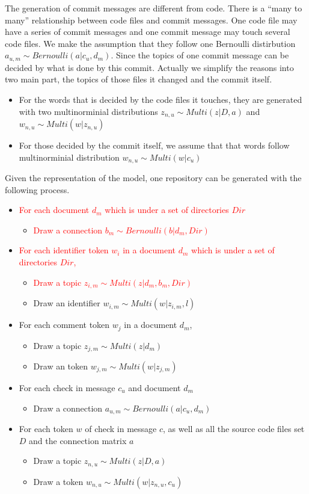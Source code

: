 The generation of commit messages are different from code. 
There is a ``many to many'' relationship between code files and commit messages.
One code file may have a series of commit messages and one commit message may touch
several code files. We make the assumption that they follow one Bernoulli distirbution
$a_{u,m}\sim Bernoulli(a|c_u,d_m)$. Since the topics of one commit message 
can be decided by what is done by this commit. Actually we simplify the reasons 
into two main part, the topics of those files it changed and the commit itself.
\begin{itemize}
\item For the words that is decided by the code files it touches, they are 
generated with two multinorminial distributions $z_{n,u}\sim Multi(z|D,a)$ and 
$w_{n,u} \sim Multi(w|z_{n,u})$ 
\item For those decided by the commit itself, we assume that that words 
follow multinorminial distribution $w_{n,u} \sim Multi(w|c_u)$ 
\end{itemize}

Given the representation of the model, one repository can be generated with the 
following process.

\begin{itemize}
\item \textcolor{red}{For each document $d_m$ which is under a set of directories $Dir$}
\begin{itemize}
\item \textcolor{red}{Draw a connection $b_{m}\sim Bernoulli(b|d_m,Dir)$}
\end{itemize}
\item \textcolor{red}{For each identifier token $w_i$ in a document $d_m$ which is under a set of directories $Dir$,}
\begin{itemize}
\item \textcolor{red}{Draw a topic $z_{i,m} \sim Multi(z|d_m,b_m,Dir)$}
\item Draw an identifier $w_{i,m} \sim Multi(w|z_{i,m},l)$
\end{itemize}
\item For each comment token $w_j$ in a document $d_m$,
\begin{itemize}
\item Draw a topic $z_{j,m} \sim Multi(z|d_m)$
\item Draw an token $w_{j,m} \sim Multi(w|z_{j,m})$
\end{itemize}
\item For each check in message $c_u$ and document $d_m$ 
\begin{itemize}
\item Draw a connection $a_{u,m}\sim Bernoulli(a|c_u,d_m)$
\end{itemize}
\item For each token $w$ of check in message $c$, as well as all the source code 
files set $D$ and the connection matrix $a$
\begin{itemize}
\item Draw a topic $z_{n,u}\sim Multi(z|D,a)$
\item Draw a token $w_{n,u} \sim Multi(w|z_{n,u},c_u)$ 
\end{itemize}
\end{itemize}

